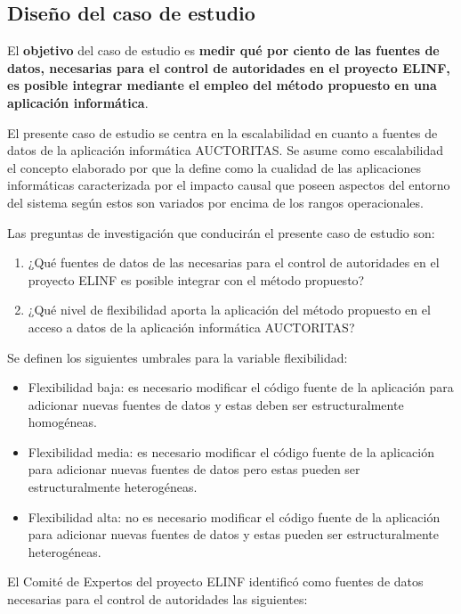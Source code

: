 \subsection{Diseño del caso de estudio}
El \textbf{objetivo} del caso de estudio es \textbf{medir qué por ciento de las fuentes de datos, necesarias para el control de autoridades en el proyecto ELINF, es posible integrar mediante el empleo del método propuesto en una aplicación informática}. 

El presente caso de estudio se centra en la escalabilidad en cuanto a fuentes de datos de la aplicación informática AUCTORITAS. Se asume como escalabilidad el concepto elaborado por \cite{duboc2006framework} que la define como la cualidad de las aplicaciones informáticas caracterizada por el impacto causal que poseen aspectos del entorno del sistema según estos son variados por encima de los rangos operacionales.

Las preguntas de investigación que conducirán el presente caso de estudio son:

\begin{enumerate}
\item ¿Qué fuentes de datos de las necesarias para el control de autoridades en el proyecto ELINF es posible integrar con el método propuesto?
\item ¿Qué nivel de flexibilidad aporta la aplicación del método propuesto en el acceso a datos de la aplicación informática AUCTORITAS?
\end{enumerate}

Se definen los siguientes umbrales para la variable flexibilidad:

\begin{itemize}
\item Flexibilidad baja: es necesario modificar el código fuente de la aplicación para adicionar nuevas fuentes de datos y estas deben ser estructuralmente homogéneas.
\item Flexibilidad media: es necesario modificar el código fuente de la aplicación para adicionar nuevas fuentes de datos pero estas pueden ser estructuralmente heterogéneas.
\item Flexibilidad alta: no es necesario modificar el código fuente de la aplicación para adicionar nuevas fuentes de datos y estas pueden ser estructuralmente heterogéneas.
\end{itemize}

El Comité de Expertos del proyecto ELINF identificó como fuentes de datos necesarias para el control de autoridades las siguientes:

